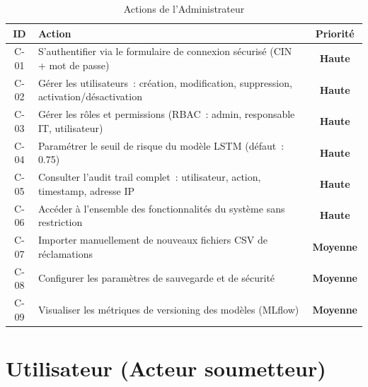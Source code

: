 \documentclass[12pt,a4paper]{report}
\newcommand{\high}{\textcolor{redAlert}{\textbf{Haute}}}
\newcommand{\medium}{\textcolor{attijariOrange}{\textbf{Moyenne}}}
\begin{document}
\begin{table}[H]
\centering
\caption{Actions de l'Administrateur}
\begin{tabularx}{\textwidth}{|c|X|c|}
\hline
\textbf{ID} & \textbf{Action} & \textbf{Priorité} \\
\hline
C-01 & S'authentifier via le formulaire de connexion sécurisé (CIN + mot de passe) & \high \\
\hline
C-02 & Gérer les utilisateurs~: création, modification, suppression, activation/désactivation & \high \\
\hline
C-03 & Gérer les rôles et permissions (RBAC~: admin, responsable IT, utilisateur) & \high \\
\hline
C-04 & Paramétrer le seuil de risque du modèle LSTM (défaut~: 0.75) & \high \\
\hline
C-05 & Consulter l'audit trail complet~: utilisateur, action, timestamp, adresse IP & \high \\
\hline
C-06 & Accéder à l'ensemble des fonctionnalités du système sans restriction & \high \\
\hline
C-07 & Importer manuellement de nouveaux fichiers CSV de réclamations & \medium \\
\hline
C-08 & Configurer les paramètres de sauvegarde et de sécurité & \medium \\
\hline
C-09 & Visualiser les métriques de versioning des modèles (MLflow) & \medium \\
\hline
\end{tabularx}
\end{table}

\section{Utilisateur (Acteur soumetteur)}
\end{document}

